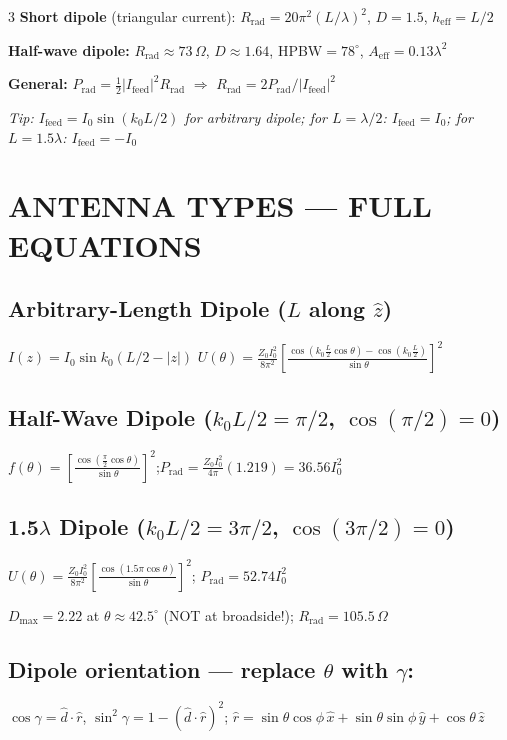 \documentclass[6pt,landscape]{article}
\begin{document}
\begin{multicols}{3}
\textbf{Short dipole} (triangular current): $R_\text{rad}=20\pi^2(L/\lambda)^2$, $D=1.5$, $h_\text{eff}=L/2$

\textbf{Half-wave dipole:} $R_\text{rad}\approx73\,\Omega$, $D\approx1.64$, HPBW$=78^\circ$, $A_\text{eff}=0.13\lambda^2$

\textbf{General:} $P_\text{rad}=\tfrac{1}{2}|I_\text{feed}|^2 R_\text{rad}$ $\Rightarrow$ $R_\text{rad}=2P_\text{rad}/|I_\text{feed}|^2$

\textit{Tip: $I_\text{feed}=I_0\sin(k_0 L/2)$ for arbitrary dipole; for $L=\lambda/2$: $I_\text{feed}=I_0$; for $L=1.5\lambda$: $I_\text{feed}=-I_0$}

\section*{ANTENNA TYPES — FULL EQUATIONS}

\subsection*{Arbitrary-Length Dipole ($L$ along $\hat{z}$)}
$I(z)=I_0\sin k_0(L/2-|z|)$
$U(\theta)=\frac{Z_0 I_0^2}{8\pi^2}\!\left[\frac{\cos(k_0\frac{L}{2}\cos\theta)-\cos(k_0\frac{L}{2})}{\sin\theta}\right]^{\!2}$

\subsection*{Half-Wave Dipole ($k_0 L/2=\pi/2$, $\cos(\pi/2)=0$)}
$f(\theta)=\left[\frac{\cos(\frac{\pi}{2}\cos\theta)}{\sin\theta}\right]^2$;\quad $P_\text{rad}=\frac{Z_0 I_0^2}{4\pi}(1.219)=36.56 I_0^2$

\subsection*{1.5$\lambda$ Dipole ($k_0 L/2=3\pi/2$, $\cos(3\pi/2)=0$)}
$U(\theta)=\frac{Z_0 I_0^2}{8\pi^2}\left[\frac{\cos(1.5\pi\cos\theta)}{\sin\theta}\right]^2$; $P_\text{rad}=52.74 I_0^2$

$D_\text{max}=2.22$ at $\theta\approx42.5^\circ$ (NOT at broadside!); $R_\text{rad}=105.5\,\Omega$

\subsection*{Dipole orientation — replace $\theta$ with $\gamma$:}
$\cos\gamma=\hat{d}\cdot\hat{r}$, $\sin^2\gamma=1-(\hat{d}\cdot\hat{r})^2$; $\hat{r}=\sin\theta\cos\phi\,\hat{x}+\sin\theta\sin\phi\,\hat{y}+\cos\theta\,\hat{z}$


\end{multicols}
\end{document}
